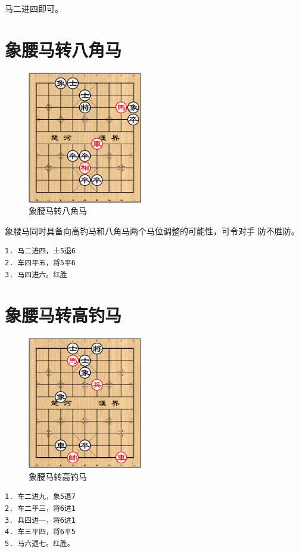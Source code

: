 \documentclass[a5paper,twoside]{book}
\begin{document}
马二进四即可。
\section{象腰马转八角马}
\label{sec-6-2}
\begin{figure}[H]
\centering
\includegraphics[width=5cm]{pic/象腰马转八角马.png}
\caption{象腰马转八角马}
\end{figure}

象腰马同时具备向高钓马和八角马两个马位调整的可能性，可令对手
防不胜防。

\begin{verbatim}
1. 马二进四，士5退6
2. 车四平五，将5平6
3. 马四进六。红胜
\end{verbatim}


\section{象腰马转高钓马}
\label{sec-6-3}
\begin{figure}[H]
\centering
\includegraphics[width=5cm]{pic/象腰马转高钓马.png}
\caption{象腰马转高钓马}
\end{figure}

\begin{verbatim}
1. 车二进九，象5退7
2. 车二平三，将6进1
3. 兵四进一，将6进1
4. 车三平四，将6平5
5. 马六退七。红胜。
\end{verbatim}
\end{document}
